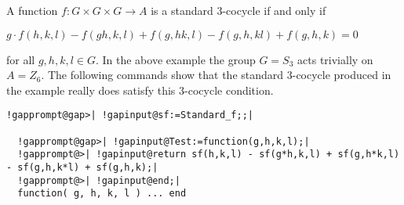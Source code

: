 \documentclass[a4paper,11pt]{report}
\begin{document}
{{\begin{Verbatim}[commandchars=!@|,fontsize=\small,frame=single,label=Example]
\end{Verbatim}
 A function $f\colon G\times G\times G \rightarrow A$ is a standard $3$-cocycle if and only if 

$g\cdot f(h,k,l) - f(gh,k,l) + f(g,hk,l) - f(g,h,kl) + f(g,h,k) = 0$ 

for all $g,h,k,l \in G$. In the above example the group $G=S_3$ acts trivially on $A=Z_6$. The following commands show that the standard $3$-cocycle produced in the example really does satisfy this $3$-cocycle condition. 
\begin{Verbatim}[commandchars=!@|,fontsize=\small,frame=single,label=Example]
  !gapprompt@gap>| !gapinput@sf:=Standard_f;;|
  
  !gapprompt@gap>| !gapinput@Test:=function(g,h,k,l);|
  !gapprompt@>| !gapinput@return sf(h,k,l) - sf(g*h,k,l) + sf(g,h*k,l) - sf(g,h,k*l) + sf(g,h,k);|
  !gapprompt@>| !gapinput@end;|
  function( g, h, k, l ) ... end
  

\end{Verbatim}}}
\end{document}
